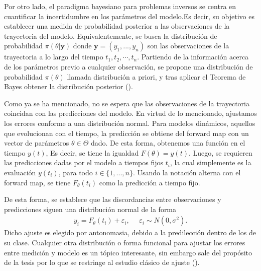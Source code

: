 Por otro lado, el paradigma bayesiano para problemas inversos se centra en cuantificar la incertidumbre en los parámetros del modelo.Es decir, su objetivo es establecer una medida de probabilidad posterior a las observaciones de la trayectoria del modelo. Equivalentemente, se busca la distribución de probabilidad $\pi(\theta|\mathbf{y})$ donde $\mathbf{y} = (y_1,...,y_n)$ son las observaciones de la trayectoria a lo largo del tiempo $t_1, t_2, \cdots, t_n$. Partiendo de la información acerca de los parámetros previo a cualquier observación, se propone una distribución de probabilidad $\pi(\theta)$ llamada distribución a priori, y tras aplicar el Teorema de Bayes obtener la distribución posterior (\cite{wasserman2013all}).

Como ya se ha mencionado, no se espera que las observaciones de la trayectoria coincidan con las predicciones del modelo. En virtud de lo mencionado, ajustamos los errores conforme a una distribución normal. Para modelos dinámicos, aquellos que evolucionan con el tiempo, la predicción se obtiene del forward map con un vector de parámetros $\theta \in \Theta$ dado.
De esta forma, obtenemos una función en el tiempo $y(t)$, Es decir, se tiene la igualdad $F(\theta) = y(t)$. Luego, se requieren las predicciones dadas por el modelo a tiempos fijos $t_i$, la cual simplemente es la evaluación $y(t_i)$, para todo $i \in \{1,...,n\}$. Usando la notación alterna con el forward map, se tiene $F_{\theta}(t_i)$ como la predicción a tiempo fijo.

De esta forma, se establece que las discordancias entre observaciones y predicciones siguen una distribución normal de la forma
\begin{align*}
    y_i = F_{\theta} (t_i) + \varepsilon_i, \:\:\:\:\:\: \varepsilon_i \sim N(0,\sigma^2).
\end{align*}
Dicho ajuste es elegido por antonomasia, debido a la predilección  dentro de los de su clase. Cualquier otra distribución o forma funcional para ajustar los errores entre medición y modelo es un tópico interesante, sin embargo sale del propósito de la tesis por lo que se restringe al estudio clásico de ajuste (\cite{berger2013statistical}).

